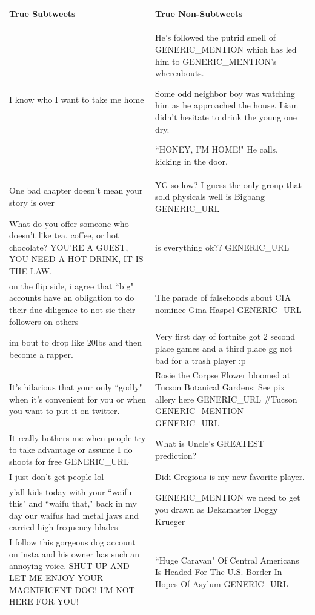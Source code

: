 \documentclass[11pt, twoside, reqno]{book}
\begin{document}
\begin{center}
	\begin{tabular}{ | p{20em} | p{20em} | }
		\hline
		True Subtweets&True Non-Subtweets
		\\ 
		\hline
		I know who I want to take me home
		&
		He's followed the putrid smell of GENERIC\_MENTION which has led him to GENERIC\_MENTION's whereabouts. 

		Some odd neighbor boy was watching him as he approached the house. 
		Liam didn't hesitate to drink the young one dry. 

		``HONEY, I'M HOME!" 
		He calls, kicking in the door.
		\\ 
		\hline
		One bad chapter doesn't mean your story is over
		&
		YG so low? I guess the only group that sold physicals well is Bigbang GENERIC\_URL
		\\
		\hline
		What do you offer someone who doesn't like tea, coffee, or hot chocolate? YOU'RE A GUEST, YOU NEED A HOT DRINK, IT IS THE LAW.
		&
		is everything ok?? GENERIC\_URL
		\\
		\hline
		on the flip side, i agree that ``big" accounts have an obligation to do their due diligence to not sic their followers on others
		&
		The parade of falsehoods about CIA nominee Gina Haspel GENERIC\_URL
		\\
		\hline
		im bout to drop like 20lbs and then become a rapper.
		&
		Very first day of fortnite got 2 second place games and a third place gg not bad for a trash player :p
		\\
		\hline
		It's hilarious that your only ``godly" when it's convenient for you or when you want to put it on twitter. 
		&
		Rosie the Corpse Flower bloomed at Tucson Botanical Gardens: See pix allery here GENERIC\_URL \#Tucson GENERIC\_MENTION GENERIC\_URL
		\\
		\hline
		It really bothers me when people try to take advantage or assume I do shoots for free GENERIC\_URL
		&
		What is Uncle's GREATEST prediction?
		\\
		\hline
		I just don't get people lol
		&
		Didi Gregious is my new favorite player.
		\\
		\hline
		y'all kids today with your ``waifu this" and ``waifu that," back in my day our waifus had metal jaws and carried high-frequency blades
		&
		GENERIC\_MENTION we need to get you drawn as Dekamaster Doggy Krueger
		\\
		\hline
		I follow this gorgeous dog account on insta and his owner has such an annoying voice. SHUT UP AND LET ME ENJOY YOUR MAGNIFICENT DOG! I'M NOT HERE FOR YOU!
		&
		``Huge Caravan" Of Central Americans Is Headed For The U.S. Border In Hopes Of Asylum GENERIC\_URL
		\\
		\hline
	\end{tabular}
\end{center}
\end{document}

